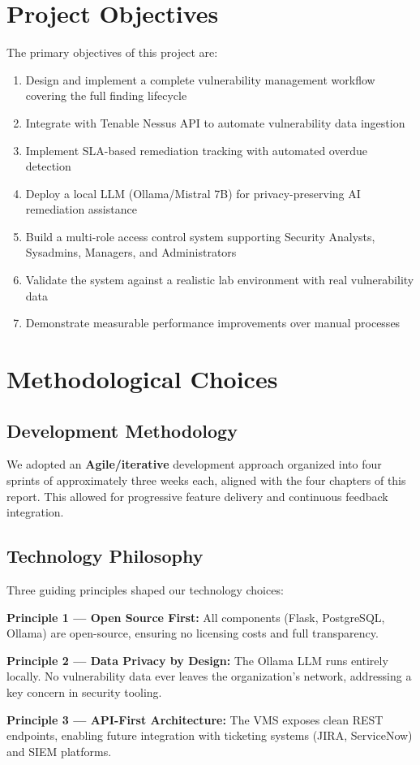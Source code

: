 \section{Project Objectives}

The primary objectives of this project are:

\begin{enumerate}
  \item Design and implement a complete vulnerability management workflow covering the full finding lifecycle
  \item Integrate with Tenable Nessus API to automate vulnerability data ingestion
  \item Implement SLA-based remediation tracking with automated overdue detection
  \item Deploy a local LLM (Ollama/Mistral 7B) for privacy-preserving AI remediation assistance
  \item Build a multi-role access control system supporting Security Analysts, Sysadmins, Managers, and Administrators
  \item Validate the system against a realistic lab environment with real vulnerability data
  \item Demonstrate measurable performance improvements over manual processes
\end{enumerate}

\section{Methodological Choices}

\subsection{Development Methodology}

We adopted an \textbf{Agile/iterative} development approach organized into four sprints of approximately three weeks each, aligned with the four chapters of this report. This allowed for progressive feature delivery and continuous feedback integration.

\subsection{Technology Philosophy}

Three guiding principles shaped our technology choices:

\begin{keybox}
\textbf{Principle 1 — Open Source First:} All components (Flask, PostgreSQL, Ollama) are open-source, ensuring no licensing costs and full transparency.

\textbf{Principle 2 — Data Privacy by Design:} The Ollama LLM runs entirely locally. No vulnerability data ever leaves the organization's network, addressing a key concern in security tooling.

\textbf{Principle 3 — API-First Architecture:} The VMS exposes clean REST endpoints, enabling future integration with ticketing systems (JIRA, ServiceNow) and SIEM platforms.
\end{keybox}


